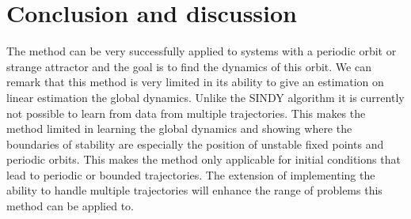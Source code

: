 \section{Conclusion and discussion}


The method can be very successfully applied to systems with a periodic orbit or strange attractor and the goal is to find the dynamics of this orbit. We can remark that this method is very limited in its ability to give an estimation on linear estimation the global dynamics. Unlike the SINDY algorithm \cite{} it is currently not possible to learn from data from multiple trajectories. This makes the method limited in learning the global dynamics and showing where the boundaries of stability are especially the position of unstable fixed points and periodic orbits. This makes the method only applicable for initial conditions that lead to periodic or bounded trajectories. The extension of implementing the ability to handle multiple trajectories will enhance the range of problems this method can be applied to. 
